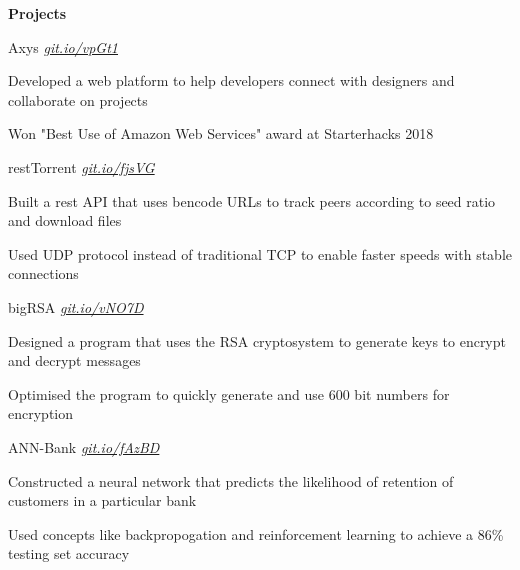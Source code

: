 \documentclass{resume} %
\begin{document}

\begin{rSection}{\textbf{Projects}}
  
  \begin{rSubsection}{Axys}
	  {\em {\href{https://github.com/MSJawad/AXYS}
		    {git.io/vpGt1}}}
	  {}

    \item Developed a web platform to help developers connect with designers and collaborate on projects
    \item Won "Best Use of Amazon Web Services" award at Starterhacks 2018
      
  \end{rSubsection}

	\begin{rSubsection}{restTorrent}
		{\em {\href{https://github.com/MSJawad/restTorrent}
				{git.io/fjsVG}}}
		{}
		
		\item Built a rest API that uses bencode URLs to track peers according to seed ratio and download files
		\item Used UDP protocol instead of traditional TCP to enable faster speeds with stable connections
		
	\end{rSubsection}

  \begin{rSubsection}{bigRSA}
	  {\em {\href{https://github.com/MSJawad/bigRSA}
		    {git.io/vNO7D}}}
	  {}

    \item Designed a program that uses the RSA cryptosystem to generate keys to encrypt and decrypt messages
    \item Optimised the program to quickly generate and use 600 bit numbers for encryption
    
    \end{rSubsection}
    
   \begin{rSubsection}{ANN-Bank}
	  {\em {\href{https://github.com/MSJawad/ANN-Bank-Solutions}
		    {git.io/fAzBD}}}
	  {}

    \item Constructed a neural network that predicts the likelihood of retention of customers in a particular bank
    \item Used concepts like backpropogation and reinforcement learning to achieve a 86\% testing set accuracy
   

\end{rSubsection}
\end{rSection}
\end{document}
